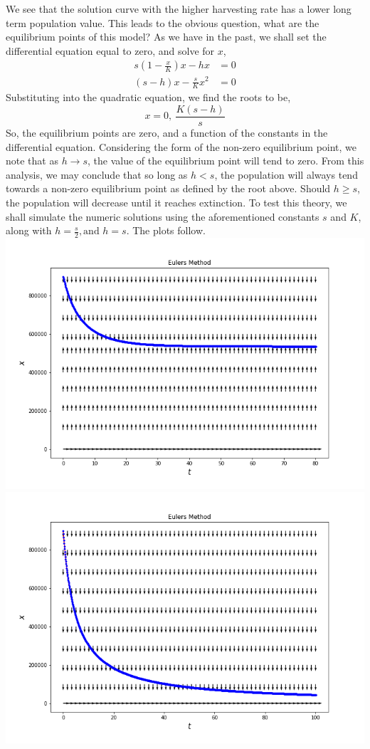 \documentclass[letterpaper,10pt]{article}
\begin{document}
We see that the solution curve with the higher harvesting rate has a lower long term population value. This leads to the obvious question, what are the equilibrium points of this model? As we have in the past, we shall set the differential equation equal to zero, and solve for $x$,
\begin{align*}
s(1-\frac{x}{K})x-hx &= 0\\
(s-h)x-\frac{s}{K}x^2 &= 0
\end{align*}
Substituting into the quadratic equation, we find the roots to be,
\[x=0,\ \frac{K(s-h)}{s}\]
So, the equilibrium points are zero, and a function of the constants in the differential equation. Considering the form of the non-zero equilibrium point, we note that as $h\to s$, the value of the equilibrium point will tend to zero. From this analysis, we may conclude that so long as $h<s$, the population will always tend towards a non-zero equilibrium point as defined by the root above. Should $h\geq s$, the population will decrease until it reaches extinction. To test this theory, we shall simulate the numeric solutions using the aforementioned constants $s$ and $K$, along with $h=\frac{s}{2},\text{and }h=s$. The plots follow.\\
\includegraphics[scale=.4]{4b1.png}
\includegraphics[scale=.4]{4b2.png}
\end{document}

